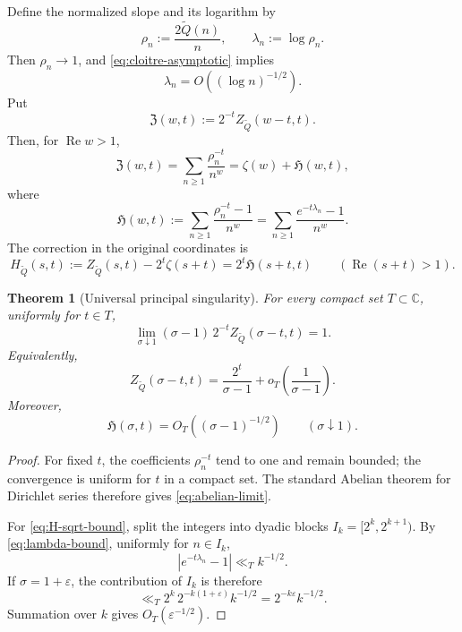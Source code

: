 \documentclass[11pt]{article}
\newtheorem{theorem}{Theorem}[section]
\theoremstyle{definition}
\theoremstyle{remark}
\newcommand{\Qp}{\widetilde Q}
\newcommand{\C}{\mathbb C}
\newcommand{\RePart}{\operatorname{Re}}
\newcommand{\Hz}{\mathfrak H}
\newcommand{\Zn}{\mathfrak Z}
\newcommand{\eps}{\varepsilon}
\begin{document}
Define the normalized slope and its logarithm by
\begin{equation}
\rho_n:=\frac{2\Qp(n)}n,
\qquad
\lambda_n:=\log\rho_n.
\label{eq:rho-lambda}
\end{equation}
Then \(\rho_n\to1\), and \eqref{eq:cloitre-asymptotic} implies
\begin{equation}
\lambda_n=O\!\left((\log n)^{-1/2}\right).
\label{eq:lambda-bound}
\end{equation}
Put
\begin{equation}
\Zn(w,t):=2^{-t}Z_{\Qp}(w-t,t).
\label{eq:normalized-zeta}
\end{equation}
Then, for \(\RePart w>1\),
\begin{equation}
\Zn(w,t)
=\sum_{n\ge1}\frac{\rho_n^{-t}}{n^w}
=\zeta(w)+\Hz(w,t),
\label{eq:normalized-zeta-decomp}
\end{equation}
where
\begin{equation}
{
\Hz(w,t)
:=\sum_{n\ge1}\frac{\rho_n^{-t}-1}{n^w}
=\sum_{n\ge1}\frac{e^{-t\lambda_n}-1}{n^w}.
}
\label{eq:H-def}
\end{equation}
The correction in the original coordinates is
\begin{equation}
{
H_{\Qp}(s,t)
:=Z_{\Qp}(s,t)-2^t\zeta(s+t)
=2^t\Hz(s+t,t)
}
\qquad(\RePart(s+t)>1).
\label{eq:raw-normalized-correction}
\end{equation}

\begin{theorem}[Universal principal singularity]
\label{thm:abelian-principal}
For every compact set \(T\subset\C\), uniformly for \(t\in T\),
\begin{equation}
\lim_{\sigma\downarrow1}
(\sigma-1)\,2^{-t}Z_{\Qp}(\sigma-t,t)=1.
\label{eq:abelian-limit}
\end{equation}
Equivalently,
\begin{equation}
Z_{\Qp}(\sigma-t,t)
=\frac{2^t}{\sigma-1}
+o_T\!\left(\frac1{\sigma-1}\right).
\label{eq:principal-zeta}
\end{equation}
Moreover,
\begin{equation}
\Hz(\sigma,t)
=O_T\!\left((\sigma-1)^{-1/2}\right)
\qquad(\sigma\downarrow1).
\label{eq:H-sqrt-bound}
\end{equation}
\end{theorem}

\begin{proof}
For fixed \(t\), the coefficients \(\rho_n^{-t}\) tend to one and remain bounded; the convergence is uniform for \(t\) in a compact set.  The standard Abelian theorem for Dirichlet series \cite{Apostol1976} therefore gives \eqref{eq:abelian-limit}.

For \eqref{eq:H-sqrt-bound}, split the integers into dyadic blocks \(I_k=[2^k,2^{k+1})\).  By \eqref{eq:lambda-bound}, uniformly for \(n\in I_k\),
\[
|e^{-t\lambda_n}-1|\ll_T k^{-1/2}.
\]
If \(\sigma=1+\eps\), the contribution of \(I_k\) is therefore
\[
\ll_T 2^k\,2^{-k(1+\eps)}k^{-1/2}
=2^{-k\eps}k^{-1/2}.
\]
Summation over \(k\) gives \(O_T(\eps^{-1/2})\).
\end{proof}
\end{document}
